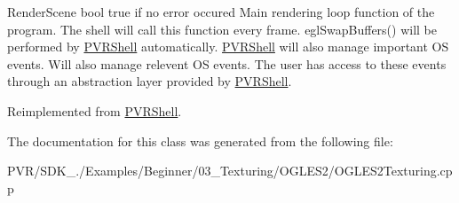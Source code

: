   Render\+Scene  bool true if no error occured  Main rendering loop function of the program. The shell will call this function every frame. egl\+Swap\+Buffers() will be performed by \hyperlink{class_p_v_r_shell}{P\+V\+R\+Shell} automatically. \hyperlink{class_p_v_r_shell}{P\+V\+R\+Shell} will also manage important O\+S events. Will also manage relevent O\+S events. The user has access to these events through an abstraction layer provided by \hyperlink{class_p_v_r_shell}{P\+V\+R\+Shell}. 

Reimplemented from \hyperlink{class_p_v_r_shell_ae0eb5f797cbe993a22b8659f9c332578}{P\+V\+R\+Shell}.



The documentation for this class was generated from the following file\+:\begin{DoxyCompactItemize}
\item 
P\+V\+R/\+S\+D\+K\+\_./\+Examples/\+Beginner/03\+\_\+\+Texturing/\+O\+G\+L\+E\+S2/O\+G\+L\+E\+S2\+Texturing.\+cpp\end{DoxyCompactItemize}
